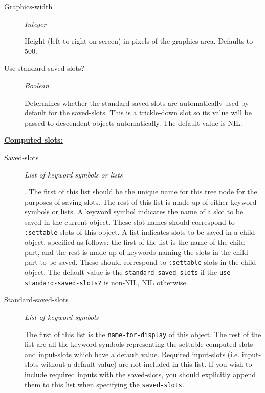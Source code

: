 \documentclass [11pt]{book}
\begin{document}
\begin{itemize}
\begin{description}
\item [Graphics-width]
\emph{Integer}

 Height (left to right on screen) in pixels of the graphics area. Defaults to 500.




\item [Use-standard-saved-slots?]
\emph{Boolean}

 Determines whether the standard-saved-slots are automatically used by default for the
saved-slots. This is a trickle-down slot so its value will be passed to descendent objects automatically.
The default value is NIL.




\end{description}






\textbf{
\underline{Computed slots:}}

\begin{description}

\item [Saved-slots]
\emph{List of keyword symbols or lists}

.
The first of this list should be the unique name for this tree node for the purposes of saving slots.
The rest of this list is made up of either keyword symbols or lists. A keyword symbol indicates the
name of a slot to be saved in the current object. These slot names should correspond to \texttt{:settable}
slots of this object. A list indicates slots to be saved in a child object, specified as
follows: the first of the list is the name of the child part, and the rest is made up of keywords naming
the slots in the child part to be saved. These should correspond to \texttt{:settable}
slots in the child object.
The default value is the \texttt{standard-saved-slots} if the \texttt{use-standard-saved-slots?} is non-NIL, NIL otherwise.




\item [Standard-saved-slots]
\emph{List of keyword symbols}

 The first of this list is the \texttt{name-for-display} of this object. The rest of the list
are all the keyword symbols representing the settable computed-slots and input-slots which have a default value. Required
input-slots (i.e. input-slots without a default value) are not included in this list. If you wish to include required
inputs with the saved-slots, you should explicitly append them to this list when specifying the \texttt{saved-slots}.





\end{description}
\end{itemize}
\end{document}

